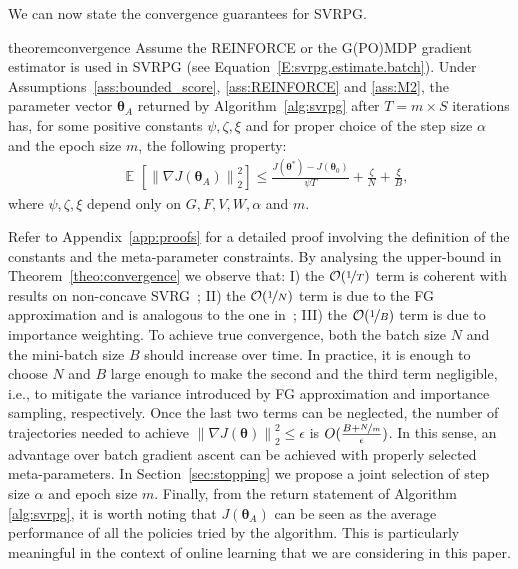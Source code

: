 \documentclass{article}
\makeatletter
\theoremstyle{remark}
\theoremstyle{definition}
\DeclareRobustCommand{\eg}{e.g.,\@\xspace}
\DeclareRobustCommand{\ie}{i.e.,\@\xspace}
\DeclareMathOperator*{\EV}{\mathbb{E}}
\newcommand{\EVV}[2][\ppvect \in \ppspace]{\EV_{#1}\left[{#2}\right]}
\newcommand{\norm}[2][\infty]{\left\|#2\right\|_{#1}}
\newcommand{\vtheta}{\boldsymbol{\theta}}
\newcommand{\gradJ}[1]{\nabla J(#1)}
\newcommand{\VARRF}{V}
\newcommand{\GRADLOG}{G}
\newcommand{\VARIS}{W}
\newcommand{\HESSLOG}{F}
\makeatother
\begin{document}
We can now state the convergence guarantees for SVRPG.
\begin{restatable}{theorem}{convergence}\label{theo:convergence}
Assume the REINFORCE or the G(PO)MDP gradient estimator is used in SVRPG (see Equation~\eqref{E:svrpg.estimate.batch}).
Under Assumptions~\ref{ass:bounded_score}, \ref{ass:REINFORCE} and \ref{ass:M2}, the parameter vector $\vtheta_A$ returned by Algorithm~\ref{alg:svrpg} after $T=m\times S$ iterations has, for some positive constants $\psi,\zeta, \xi$ and for proper choice of the step size $\alpha$ and the epoch size $m$, the following property:
\begin{align*}
	&\EVV[]
	{\norm[2]{\nabla J(\vtheta_A)}^2} 
		\leq
		\frac{J(\vtheta^*)-J(\vtheta_0)}{\psi T} +
		\frac{\zeta}{N}
		+\frac{\xi}{B},
\end{align*}
where $\psi,\zeta,\xi$ depend only on $\GRADLOG,\HESSLOG,\VARRF,\VARIS,\alpha$ and $m$.
\end{restatable}
Refer to Appendix~\ref{app:proofs} for a detailed proof involving the definition of the constants and the meta-parameter constraints.
By analysing the upper-bound in Theorem~\ref{theo:convergence} we observe that: I) the $\mathcal{O}(\nicefrac{1}{T})$ term is coherent with results on non-concave SVRG~\citep[\eg][]{reddi2016stochastic}; II) the $\mathcal{O}(\nicefrac{1}{N})$ term is due to the FG approximation and is analogous to the one in~\citep{harikandeh2015stopwasting}; III) the $\mathcal{O}(\nicefrac{1}{B})$ term is due to importance weighting.
To achieve true convergence, both the batch size $N$ and the mini-batch size $B$ should increase over time. 
In practice, it is enough to choose $N$ and $B$ large enough to make the second and the third term negligible, \ie to mitigate the variance introduced by FG approximation and importance sampling, respectively.
Once the last two terms can be neglected, the number of trajectories needed to achieve $\norm[2]{\gradJ{\vtheta}}^2\leq\epsilon$ is $O(\frac{B+\nicefrac{N}{m}}{\epsilon})$. In this sense, an advantage over batch gradient ascent can be achieved with properly selected meta-parameters. In Section~\ref{sec:stopping} we propose a joint selection of step size $\alpha$ and epoch size $m$.
Finally, from the return statement of Algorithm \ref{alg:svrpg}, it is worth noting that $J(\vtheta_A)$ can be seen as the average performance of all the policies tried by the algorithm. This is particularly meaningful in the context of online learning that we are considering in this paper.
\end{document}
